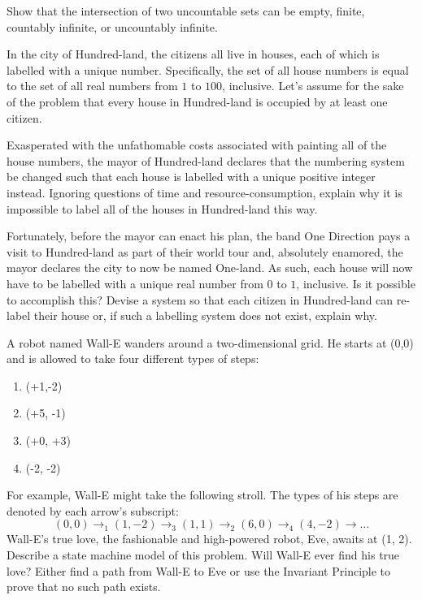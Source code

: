 \documentclass[solution, letterpaper]{cs20}
\begin{document}

Show that the intersection of two uncountable sets can be empty, finite, countably
infinite, or uncountably infinite.

In the city of Hundred-land, the citizens all live in houses, each of which is labelled with a unique number. Specifically, the set of all house numbers is equal to the set of all real numbers from $1$ to $100$, inclusive. Let's assume for the sake of the problem that every house in Hundred-land is occupied by at least one citizen.

\subproblem Exasperated with the unfathomable costs associated with painting all of the house numbers, the mayor of Hundred-land declares that the numbering system be changed such that each house is labelled with a unique positive integer instead. Ignoring questions of time and resource-consumption, explain why it is impossible to label all of the houses in Hundred-land this way.

\subproblem Fortunately, before the mayor can enact his plan, the band One Direction pays a visit to Hundred-land as part of their world tour and, absolutely enamored, the mayor declares the city to now be named One-land. As such, each house will now have to be labelled with a unique real number from $0$ to $1$, inclusive. Is it possible to accomplish this? Devise a system so that each citizen in Hundred-land can re-label their house or, if such a labelling system does not exist, explain why.

A robot named Wall-E wanders around a two-dimensional grid. He starts at (0,0) and is allowed to take four different types of steps:
\begin{enumerate}
\item (+1,-2)
\item (+5, -1)
\item (+0, +3)
\item (-2, -2)
\end{enumerate}
For example, Wall-E might take the following stroll. The types of his steps are denoted by each arrow's subscript:
$$(0,0) \to_1 (1,-2) \to_3 (1,1) \to_2 (6,0) \to_4 (4,-2) \to \ldots$$
Wall-E's true love, the fashionable and high-powered robot, Eve, awaits at (1, 2).
\subproblem Describe a state machine model of this problem.
\subproblem Will Wall-E ever find his true love? Either find a path from Wall-E to Eve or use the Invariant Principle to prove that no such path exists.
\end{document}
